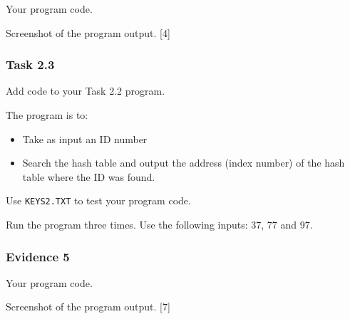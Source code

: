 Your program code.

Screenshot of the program output. \hfill{}{[}4{]}

\subsubsection*{Task 2.3}

Add code to your Task 2.2 program. 

The program is to: 
\begin{itemize}
\item Take as input an ID number 
\item Search the hash table and output the address (index number) of the
hash table where the ID was found. 
\end{itemize}
Use \texttt{KEYS2.TXT} to test your program code. 

Run the program three times. Use the following inputs: 37, 77 and
97.

\subsubsection*{Evidence 5}

Your program code.

Screenshot of the program output. \hfill{}{[}7{]}